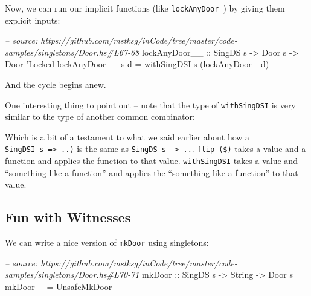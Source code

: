 \documentclass[]{article}
\newenvironment{Shaded}{\begin{snugshade}}{\end{snugshade}}
\newcommand{\CharTok}[1]{\textcolor[rgb]{0.31,0.60,0.02}{#1}}
\newcommand{\CommentTok}[1]{\textcolor[rgb]{0.56,0.35,0.01}{\textit{#1}}}
\newcommand{\DataTypeTok}[1]{\textcolor[rgb]{0.13,0.29,0.53}{#1}}
\newcommand{\FunctionTok}[1]{\textcolor[rgb]{0.00,0.00,0.00}{#1}}
\newcommand{\NormalTok}[1]{#1}
\newcommand{\OtherTok}[1]{\textcolor[rgb]{0.56,0.35,0.01}{#1}}
\begin{document}
Now, we can run our implicit functions (like \texttt{lockAnyDoor\_}) by giving
them explicit inputs:

\begin{Shaded}
\begin{Highlighting}[]
\CommentTok{-- source: https://github.com/mstksg/inCode/tree/master/code-samples/singletons/Door.hs#L67-68}
\OtherTok{lockAnyDoor__ ::} \DataTypeTok{SingDS}\NormalTok{ s }\OtherTok{->} \DataTypeTok{Door}\NormalTok{ s }\OtherTok{->} \DataTypeTok{Door} \CharTok{'Locked}
\NormalTok{lockAnyDoor__ s d }\FunctionTok{=}\NormalTok{ withSingDSI s (lockAnyDoor_ d)}
\end{Highlighting}
\end{Shaded}

And the cycle begins anew.

One interesting thing to point out -- note that the type of \texttt{withSingDSI}
is very similar to the type of another common combinator:

\begin{Shaded}
\end{Shaded}

Which is a bit of a testament to what we said earlier about how a
\texttt{SingDSI\ s\ =\textgreater{}\ ..)} is the same as
\texttt{SingDS\ s\ -\textgreater{}\ ..}. \texttt{flip\ (\$)} takes a value and a
function and applies the function to that value. \texttt{withSingDSI} takes a
value and ``something like a function'' and applies the ``something like a
function'' to that value.

\hypertarget{fun-with-witnesses}{%
\subsection{Fun with Witnesses}\label{fun-with-witnesses}}

We can write a nice version of \texttt{mkDoor} using singletons:

\begin{Shaded}
\begin{Highlighting}[]
\CommentTok{-- source: https://github.com/mstksg/inCode/tree/master/code-samples/singletons/Door.hs#L70-71}
\OtherTok{mkDoor ::} \DataTypeTok{SingDS}\NormalTok{ s }\OtherTok{->} \DataTypeTok{String} \OtherTok{->} \DataTypeTok{Door}\NormalTok{ s}
\NormalTok{mkDoor _ }\FunctionTok{=} \DataTypeTok{UnsafeMkDoor}
\end{Highlighting}
\end{Shaded}
\end{document}
